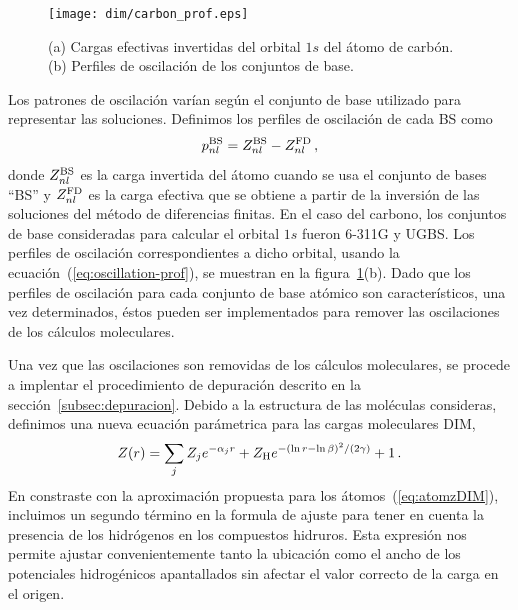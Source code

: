 \begin{figure}[t]
\centering
\texttt{[image: dim/carbon\_prof.eps]}
\caption[Inversión de funciones de onda descritas con conjuntos de base.]
{(a) Cargas efectivas invertidas del orbital $1s$ del átomo de carbón.
(b) Perfiles de oscilación de los conjuntos de base.}
\label{fig:1sCarbon}
\end{figure}

Los patrones de oscilación varían según el conjunto de base utilizado
para representar las soluciones. Definimos los perfiles de oscilación
de cada BS como
\begin{equation}
 p_{nl}^{\mbox{\scriptsize BS}} = Z_{nl}^{\mbox{\scriptsize BS}}-
 Z_{nl}^{\mbox{\scriptsize FD}} \,,
 \label{eq:oscillation-prof}
\end{equation}
donde $Z_{nl}^{\mbox{\scriptsize BS}}$ es la carga invertida del átomo
cuando se usa el conjunto de bases ``BS'' y $Z_{nl}^{\mbox{\scriptsize FD}}$ 
es la carga efectiva que se obtiene a partir de la inversión de las 
soluciones del método de diferencias finitas. En el caso del carbono,
los conjuntos de base consideradas para calcular el orbital $1s$ fueron
\mbox{6-311G} y UGBS. Los perfiles de oscilación correspondientes a
dicho orbital, usando la ecuación~(\ref{eq:oscillation-prof}), 
se muestran en la figura~\ref{fig:1sCarbon}(b). Dado que los perfiles 
de oscilación para cada conjunto de base atómico son característicos,
una vez determinados, éstos pueden ser implementados para remover las
oscilaciones de los cálculos moleculares. 

Una vez que las oscilaciones son removidas de los cálculos moleculares, 
se procede a implentar el procedimiento de depuración descrito en la
sección~\ref{subsec:depuracion}. Debido a la 
estructura de las moléculas consideras, definimos una nueva ecuación 
parámetrica para las cargas moleculares DIM,
\begin{eqnarray}
 Z(r) = \sum_j Z_j e^{-\alpha_j r} 
 + Z_{\mbox{\scriptsize H}} e^{-(\ln r - \ln \beta)^2/(2\gamma)} 
 + 1\,.
 \label{eq:molzDIM}
\end{eqnarray}
En constraste con la aproximación propuesta para los 
átomos~(\ref{eq:atomzDIM}), incluimos un segundo término en la 
formula de ajuste para tener en cuenta la presencia de los hidrógenos en 
los compuestos hidruros. Esta expresión nos permite ajustar 
convenientemente tanto la ubicación como el ancho de los potenciales
hidrogénicos apantallados sin afectar el valor correcto de la carga en 
el origen.


